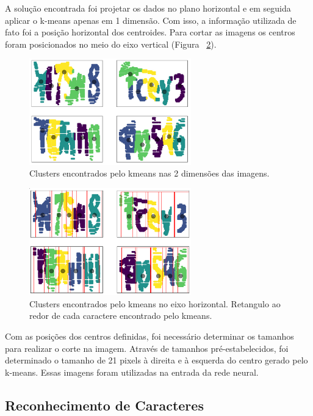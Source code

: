 \documentclass[11pt]{article}
\begin{document}
A solução encontrada foi projetar os dados no plano horizontal e em seguida aplicar o k-means apenas em 1 dimensão. Com isso, a informação utilizada de fato foi a posição horizontal dos centroides. Para cortar as imagens os centros foram posicionados no meio do eixo vertical (Figura ~\ref{fig:kmeans1d}).

  \begin{figure}
        {\centering
        \includegraphics[width=70mm]{images/2dkmeans.png}
        \caption{Clusters encontrados pelo kmeans nas 2 dimensões das imagens.}
        \label{fig:kmeans2d}\par}
  \end{figure}

  \begin{figure}
        {\centering
        \includegraphics[width=70mm]{images/1dkmeans.png}
        \caption{Clusters encontrados pelo kmeans no eixo horizontal. Retangulo ao redor de cada caractere encontrado pelo kmeans.}
        \label{fig:kmeans1d}\par}
  \end{figure}

Com as posições dos centros definidas, foi necessário determinar os tamanhos para realizar o corte na imagem. Através de tamanhos pré-estabelecidos, foi determinado o tamanho de 21 pixels à direita e à esquerda do centro gerado pelo k-means. Essas imagens foram utilizadas na entrada da rede neural. 

\subsection{Reconhecimento de Caracteres}
\label{ssec:convnet}
\end{document}
